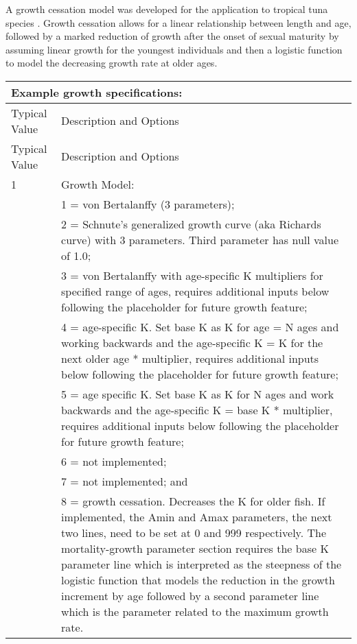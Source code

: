 \hypertarget{GrowthCessation}{}
A growth cessation model was developed for the application to tropical tuna species \citep{maunder-growth-2018}. Growth cessation allows for a linear relationship between length and age, followed by a marked reduction of growth after the onset of sexual maturity by assuming linear growth for the youngest individuals and then a logistic function to model the decreasing growth rate at older ages.

\vspace*{-\baselineskip}	
\begin{longtable}{p{0.5cm} p{2cm} p{12.5cm}}
	\multicolumn{3}{l}{Example growth specifications:} \Tstrut\Bstrut\\
	\hline	
	\multicolumn{2}{l}{Typical Value} & Description and Options \Tstrut\Bstrut\\
	\hline
	\endfirsthead

	\hline
	\multicolumn{2}{l}{Typical Value} & Description and Options \Tstrut\Bstrut\\
	\hline
	\endhead
	\hline

	\endfoot
	
	\endlastfoot

	1 & & Growth Model: \Tstrut\\
	  & & 1 = von Bertalanffy (3 parameters); \\
	  & & 2 = Schnute's generalized growth curve (aka Richards curve) with 3 parameters. Third parameter has null value of 1.0; \\
	  & & 3 = von Bertalanffy with age-specific K multipliers for specified range of ages, requires additional inputs below following the placeholder for future growth feature; \\
	  & & 4 = age-specific K. Set base K as K for age = N ages and working backwards and the age-specific K = K for the next older age * multiplier, requires additional inputs below following the placeholder for future growth feature; \\
	  & & 5 = age specific K. Set base K as K for N ages and work backwards and the age-specific K = base K * multiplier, requires additional inputs below following the placeholder for future growth feature; \\
	  & & 6 = not implemented; \\
	  & & 7 = not implemented; and \\
	  & & 8 = growth cessation. Decreases the K for older fish. If implemented, the Amin and Amax parameters, the next two lines, need to be set at 0 and 999 respectively. The mortality-growth parameter section requires the base K parameter line which is interpreted as the steepness of the logistic function that models the reduction in the growth increment by age followed by a second parameter line which is the parameter related to the maximum growth rate. \Bstrut\\
	\hline


\end{longtable}

